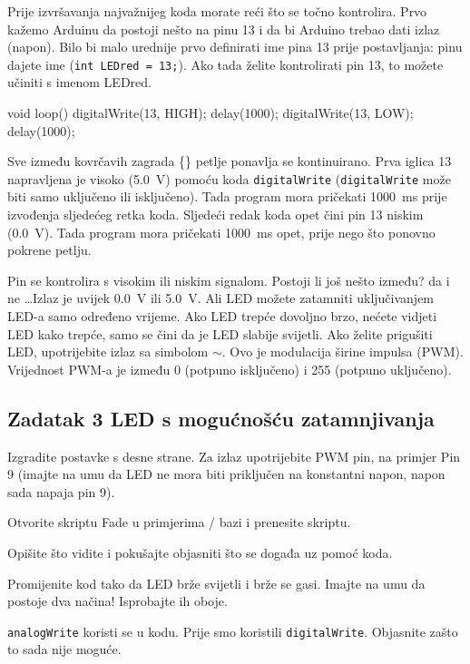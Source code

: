 \documentclass{arduino}
\begin{document}
Prije izvršavanja najvažnijeg koda morate reći što se točno kontrolira. Prvo kažemo Arduinu da postoji nešto na pinu 13 i da bi Arduino trebao dati izlaz (napon). Bilo bi malo urednije prvo definirati ime pina 13 prije postavljanja: pinu dajete ime (\lstinline{int LEDred = 13;}). Ako tada želite kontrolirati pin 13, to možete učiniti s imenom LEDred.
\begin{marginlisting}
void loop() {
  digitalWrite(13, HIGH);
  delay(1000);
  digitalWrite(13, LOW);
  delay(1000);
}
\end{marginlisting}

Sve između kovrčavih zagrada \{\} petlje ponavlja se kontinuirano. Prva iglica 13 napravljena je visoko (\SI{5.0}{\volt}) pomoću koda \lstinline{digitalWrite} (\lstinline{digitalWrite} može biti samo uključeno ili isključeno). Tada program mora pričekati \SI{1000}{\milli\s} prije izvođenja sljedećeg retka koda. Sljedeći redak koda opet čini pin 13 niskim (\SI{0.0}{\volt}). Tada program mora pričekati \SI{1000}{\milli\s} opet, prije nego što ponovno pokrene petlju.


Pin se kontrolira s visokim ili niskim signalom. Postoji li još nešto između? da i ne \dots Izlaz je uvijek \SI{0.0}{\volt} ili \SI{5.0}{\volt}. Ali LED možete zatamniti uključivanjem LED-a samo određeno vrijeme. Ako LED trepće dovoljno brzo, nećete vidjeti LED kako trepće, samo se čini da je LED slabije svijetli. Ako želite prigušiti LED, upotrijebite izlaz sa simbolom $\sim$. Ovo je modulacija širine impulsa (PWM). Vrijednost PWM-a je između 0 (potpuno isključeno) i 255 (potpuno uključeno).
\newpage

\subsection{Zadatak 3 LED s mogućnošću zatamnjivanja}


\begin{alphalist}
\item Izgradite postavke s desne strane. Za izlaz upotrijebite PWM pin, na primjer Pin 9 (imajte na umu da LED ne mora biti priključen na konstantni napon, napon sada napaja pin 9).

\item Otvorite skriptu Fade u primjerima / bazi i prenesite skriptu.

\item Opišite što vidite i pokušajte objasniti što se događa uz pomoć koda.

\item Promijenite kod tako da LED brže svijetli i brže se gasi. Imajte na umu da postoje dva načina! Isprobajte ih oboje.

\item \lstinline{analogWrite} koristi se u kodu. Prije smo koristili \lstinline{digitalWrite}. Objasnite zašto to sada nije moguće.
\end{alphalist}
\end{document}
